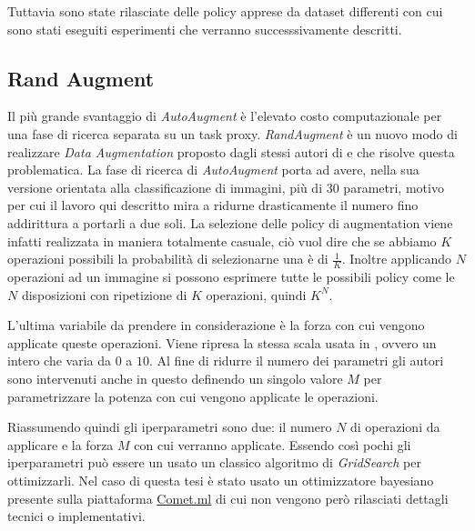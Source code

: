 Tuttavia sono state rilasciate delle policy apprese da dataset differenti con cui sono stati eseguiti esperimenti che verranno successsivamente descritti. 
\subsection{Rand Augment}
\label{subsec:rand_augment}
Il più grande svantaggio di \textit{AutoAugment} è l'elevato costo computazionale per una fase di ricerca separata su un task proxy. \textit{RandAugment} \cite{DBLP:journals/corr/abs-1909-13719} è un nuovo modo di realizzare \textit{Data Augmentation} proposto dagli stessi autori di \cite{DBLP:journals/corr/abs-1805-09501} e \cite{DBLP:journals/corr/abs-1906-11172} che risolve questa problematica. La fase di ricerca di \textit{AutoAugment} porta ad avere, nella sua versione orientata alla classificazione di immagini, più di 30 parametri, motivo per cui il lavoro qui descritto mira a ridurne drasticamente il numero fino addirittura a portarli a due soli. La selezione delle policy di augmentation viene infatti realizzata in maniera totalmente casuale, ciò vuol dire che se abbiamo $K$ operazioni possibili la probabilità di selezionarne una è di $\frac{1}{K}$. Inoltre applicando $N$ operazioni ad un immagine si possono esprimere tutte le possibili policy come le $N$ disposizioni con ripetizione di $K$ operazioni, quindi $K^N$.

L'ultima variabile da prendere in considerazione è la forza con cui vengono applicate queste operazioni. Viene ripresa la stessa scala usata in \cite{DBLP:journals/corr/abs-1805-09501}, ovvero un intero che varia da $0$ a $10$.
Al fine di ridurre il numero dei parametri gli autori sono intervenuti anche in questo definendo un singolo valore $M$ per parametrizzare la potenza con cui vengono applicate le operazioni. 

Riassumendo quindi gli iperparametri sono due: il numero $N$ di operazioni da applicare e la forza $M$ con cui verranno applicate. Essendo così pochi gli iperparametri può essere un usato un classico algoritmo di \textit{GridSearch} per ottimizzarli. Nel caso di questa tesi è stato usato un ottimizzatore bayesiano presente sulla piattaforma \href{https://www.comet.ml/}{Comet.ml} di cui non vengono però rilasciati dettagli tecnici o implementativi.

